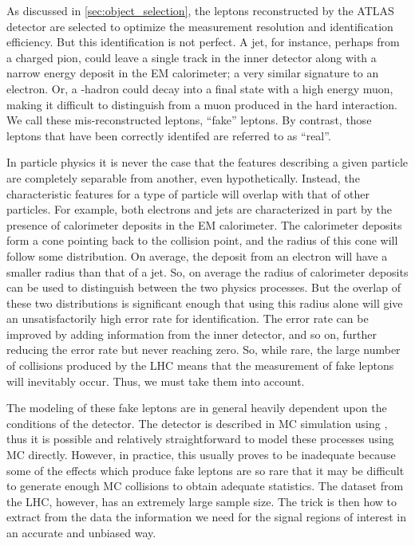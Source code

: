


As discussed in \sec\ref{sec:object_selection},
the leptons reconstructed by the ATLAS detector are selected
to optimize the measurement resolution and identification efficiency.
But this identification is not perfect. A jet,
for instance, perhaps from a charged pion, could leave a single
track in the inner detector along with a narrow energy deposit in the
EM calorimeter; a very similar signature to an electron. Or, 
a \bee-hadron could decay into a final state with a high energy muon,
making it difficult to distinguish from a muon produced in the hard interaction.
We call these mis-reconstructed leptons, ``fake'' leptons. 
By contrast, those leptons that have been correctly identifed are 
referred to as ``real''.

In particle physics it is 
never the case that the features describing 
a given particle are completely separable
from another, even hypothetically. Instead,
the characteristic features for a type of particle will 
overlap with that of other particles. For example, both electrons
and jets are characterized in part by the presence of calorimeter
deposits in the EM calorimeter. 
The calorimeter deposits form a cone 
pointing back to the collision point, and the radius
of this cone will follow some distribution. On average,
the deposit from an electron will have a smaller radius 
than that of a jet. So, on average the radius of calorimeter
deposits can be used to distinguish between the two physics
processes. But the overlap of these two distributions is 
significant enough that using this radius alone
will give an unsatisfactorily high error rate for identification.
The error rate can be improved by adding information 
from the inner detector, and so on, further reducing
the error rate but never reaching zero.
So, while rare, the large number of collisions produced by the LHC
means that the measurement of fake leptons will inevitably occur. 
Thus, we must take them into account.

The modeling of these fake leptons are in general 
heavily dependent upon the conditions of the detector. 
The detector is described in MC simulation using \geant, thus
it is possible and relatively straightforward 
to model these processes using MC directly.
However, in practice, this usually proves to be inadequate
because some of the effects which produce fake leptons 
are so rare that it may be difficult to generate enough MC
collisions to obtain adequate statistics.
The dataset from the LHC, however, has an extremely large sample size.
The trick is then how to extract from the data the information we need
for the signal regions of interest in an accurate and unbiased way.



